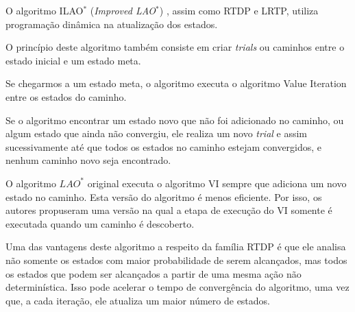 
O algoritmo ILAO$^*$ (\textit{Improved LAO$^*$}) \cite{ilao}, assim como RTDP e 
LRTP, utiliza programação dinâmica na atualização dos estados.

O princípio deste algoritmo também consiste em criar \textit{trials} ou caminhos entre o estado inicial e um estado meta.

Se chegarmos a um estado meta, o algoritmo executa o algoritmo Value Iteration entre os estados do caminho. 

Se o algoritmo encontrar um estado novo que não foi adicionado no caminho, ou algum estado que ainda não convergiu, ele realiza um novo \textit{trial} e assim sucessivamente até que todos os estados no caminho estejam convergidos, e nenhum caminho novo seja encontrado.

O algoritmo $LAO^*$ original executa o algoritmo VI sempre que adiciona um novo estado no caminho. Esta versão do algoritmo é menos eficiente. Por isso, os autores propuseram uma versão na qual a etapa de execução do VI somente é executada quando um caminho é descoberto.

Uma das vantagens deste algoritmo a respeito da família RTDP é que ele analisa não somente os estados com maior probabilidade de serem alcançados, mas todos os estados que podem ser alcançados a partir de uma mesma ação não determinística. Isso pode acelerar o tempo de convergência do algoritmo, uma vez que, a cada iteração, ele atualiza um maior número de estados.